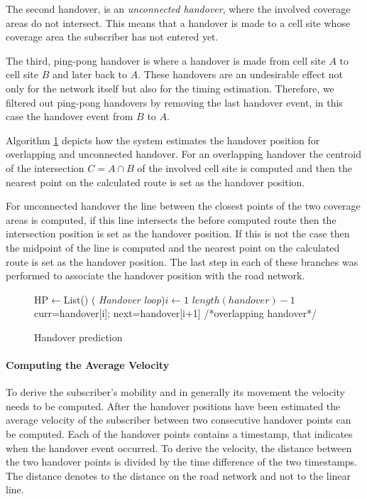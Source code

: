\documentclass[twocolumn]{bmcart}%
\makeatletter
\newcommand{\removelatexerror}{\let\@latex@error\@gobble}
\makeatother
\begin{document}
The second handover, is an \emph{unconnected handover}, where the involved coverage areas do not intersect. This means that a handover is made to a cell site whose coverage area the subscriber has not entered yet.

The third, ping-pong handover is where a handover is made from cell site $A$ to cell site $B$ and later back to $A$. These handovers are an undesirable effect not only for the network itself but also for the timing estimation. Therefore, we filtered out ping-pong handovers by removing the last handover event, in this case the handover event from $B$ to $A$.

Algorithm \ref{alg:prediction} depicts how the system estimates the handover position for overlapping and unconnected handover. For an overlapping handover the centroid of the intersection $C=A \cap B$ of the involved cell site is computed and then the nearest point on the calculated route is set as the handover position. 

For unconnected handover the line between the closest points of the two coverage areas is computed, if this line intersects the before computed route then the intersection position is set as the handover position. If this is not the case then the midpoint of the line is computed and the nearest point on the calculated route is set as the handover position. The last step in each of these branches was performed to associate the handover position with the road network.
\SetAlFnt{\footnotesize}

\begin{figure}[!t]
	\removelatexerror
	\begin{algorithm}[H]
		\caption{Handover prediction}
		\label{alg:prediction}
		HP$\leftarrow$List()\;
		\For( \emph{Handover loop}){$i\leftarrow 1$ \KwTo $length(handover)-1$}
		{
			curr=handover[i]; next=handover[i+1]\;
			/*overlapping handover*/\\
		}
	\end{algorithm}
\end{figure}

\paragraph{Computing the Average Velocity}
To derive the subscriber's mobility and in generally its movement the velocity needs to be computed. 
After the handover positions have been estimated the average velocity of the subscriber between two consecutive handover points can be computed. 
Each of the handover points contains a timestamp, that indicates when the handover event occurred. To derive the velocity, the distance between the two handover points is divided by the time difference of the two timestamps. The distance denotes to the distance on the road network and not to the linear line. 
\end{document}
